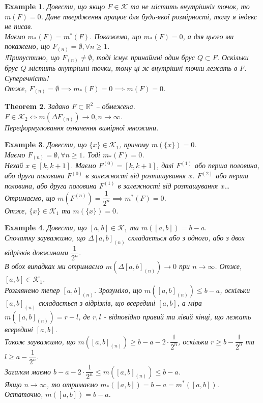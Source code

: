 \documentclass[a4paper, 10pt]{article}
\theoremstyle{theoremdd}
\newtheorem{theorem}{Theorem}[subsection]
\theoremstyle{theoremdd}
\theoremstyle{theoremdd}
\theoremstyle{theoremdd}
\newtheorem{example}[theorem]{Example}
\theoremstyle{theoremdd}
\theoremstyle{theoremdd}
\theoremstyle{theoremdd}
\theoremstyle{theoremdd}
\begin{document}
\begin{example}
Довести, що якщо $F \in \mathcal{K}$ та не містить внутрішніх точок, то $m(F) = 0$. Дане твердження працює для будь-якої розмірності, тому я індекс не писав.\\
Маємо $m_*(F) = m^*(F)$. Покажемо, що $m_*(F) = 0$, а для цього ми покажемо, що $F_{(n)} = \emptyset, \forall n \geq 1$.\\
!Припустимо, що $F_{(n)} \neq \emptyset$, тоді існує принаймні один брус $Q \subset F$. Оскільки брус $Q$ містить внутрішні точки, тому ці ж внутрішні точки лежать в $F$. Суперечність!\\
Отже, $F_{(n)} = \emptyset \implies m_*(F) = 0 \implies m(F) = 0$.
\end{example}

\begin{theorem}
Задано $F \subset \mathbb{R}^2$ -- обмежена.\\
$F \in \mathcal{K}_2 \iff m(\Delta F_{(n)}) \to 0, n \to \infty$.\\
\textit{Переформулювання означення вимірної множини.}
\end{theorem}

\begin{example}
Довести, що $\{x\} \in \mathcal{K}_1$, причому $m(\{x\}) = 0$.\\
Маємо $F_{(n)} = \emptyset, \forall n \geq 1$. Тоді $m_*(F) = 0$.\\
Нехай $x \in [k,k+1]$. Маємо $F^{(0)} = [k,k+1]$, далі $F^{(1)}$ або перша половина, або друга половина $F^{(0)}$ в залежності від розташування $x$. $F^{(2)}$ або перша половина, або друга половина $F^{(1)}$ в залежності від розташування $x$\dots \\
Отримаємо, що $m(F^{(n)}) = \dfrac{1}{2^n} \implies m^*(F) = 0$.\\
Отже, $\{x\} \in \mathcal{K}_1$ та $m(\{x\}) = 0$.
\end{example}

\begin{example}
Довести, що $[a,b] \in \mathcal{K}_1$ та $m([a,b]) = b-a$.\\
Спочатку зауважимо, що $\Delta [a,b]_{(n)}$ складається або з одного, або з двох відрізків довжинами $\dfrac{1}{2^n}$.\\
В обох випадках ми отримаємо $m(\Delta [a,b]_{(n)}) \to 0$ при $n \to \infty$. Отже, $[a,b] \in \mathcal{K}_1$.\\
Розглянемо тепер $[a,b]_{(n)}$. Зрозуміло, що $m([a,b]_{(n)}) \leq b-a$, оскільки $[a,b]_{(n)}$ складається з відрізків, що всередині $[a,b]$, а міра $m([a,b]_{(n)}) = r - l$, де $r,l$ - відповідно правий та лівий кінці, що лежать всередині $[a,b]$.\\
Також зауважимо, що $m([a,b]_{(n)}) \geq b-a -2 \cdot \dfrac{1}{2^n}$, оскільки $r \geq b- \dfrac{1}{2^n}$ та $l \geq a- \dfrac{1}{2^n}$.\\
Загалом маємо $b-a- 2 \cdot \dfrac{1}{2^n} \leq m([a,b]_{(n)}) \leq b-a$.\\
Якщо $n \to \infty$, то отримаємо $m_*([a,b]) = b-a = m^*([a,b])$.\\
Остаточно, $m([a,b]) = b-a$.
\end{example}
\end{document}

